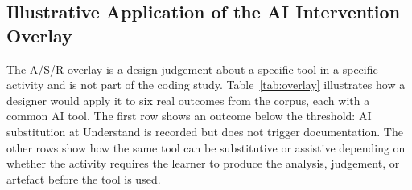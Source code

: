 \documentclass[journal,article,submit,pdftex,moreauthors]{Definitions/mdpi}
\begin{document}
\subsection{Illustrative Application of the AI Intervention Overlay}
\label{sec:res_overlay}

The A/S/R overlay is a design judgement about a specific tool in a specific activity and is not part of the coding study. Table~\ref{tab:overlay} illustrates how a designer would apply it to six real outcomes from the corpus, each with a common AI tool. The first row shows an outcome below the threshold: AI substitution at Understand is recorded but does not trigger documentation. The other rows show how the same tool can be substitutive or assistive depending on whether the activity requires the learner to produce the analysis, judgement, or artefact before the tool is used.
\end{document}
